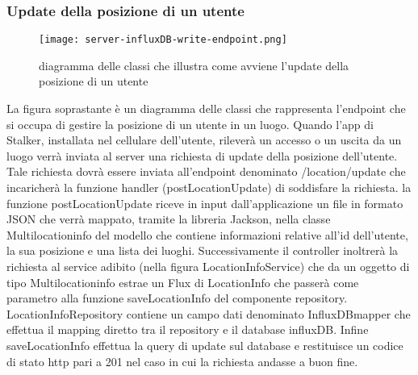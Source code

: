 \documentclass[../../manuale-manutentore.tex]{subfiles}
\begin{document}
\subsubsection{Update della posizione di un utente}%
\label{subs:update_della_posizione_di_un_utente}

  \begin{figure}[H]
    \centering
    \texttt{[image: server-influxDB-write-endpoint.png]}
    \caption{diagramma delle classi che illustra come avviene l'update della posizione di un utente}%
     \label{fig:diagramma delle classi che illustra come avviene l'update della posizione di un}
  \end{figure}

  La figura soprastante è un diagramma delle classi che rappresenta l'endpoint che si occupa di gestire la posizione di un utente in un luogo.
  Quando l'app di Stalker, installata nel cellulare dell'utente, rileverà un accesso o un uscita da un luogo verrà inviata al server una richiesta di update della posizione dell'utente.
  Tale richiesta dovrà essere inviata all'endpoint denominato /location/update che incaricherà la funzione handler (postLocationUpdate) di soddisfare la richiesta.
  la funzione postLocationUpdate riceve in input dall'applicazione un file in formato JSON che verrà mappato, tramite la libreria Jackson, nella classe Multilocationinfo del modello che contiene informazioni relative all'id dell'utente, la sua posizione e una lista dei luoghi.
  Successivamente il controller inoltrerà la richiesta al service adibito (nella figura LocationInfoService) che da un oggetto di tipo Multilocationinfo estrae un Flux di LocationInfo che passerà come parametro alla funzione saveLocationInfo del componente repository.
  LocationInfoRepository contiene un campo dati denominato InfluxDBmapper che effettua il mapping diretto tra il repository e il database influxDB\@. Infine saveLocationInfo effettua la query di update sul database e restituisce un codice di stato http pari a 201 nel caso in cui la richiesta andasse a buon fine.
\end{document}
